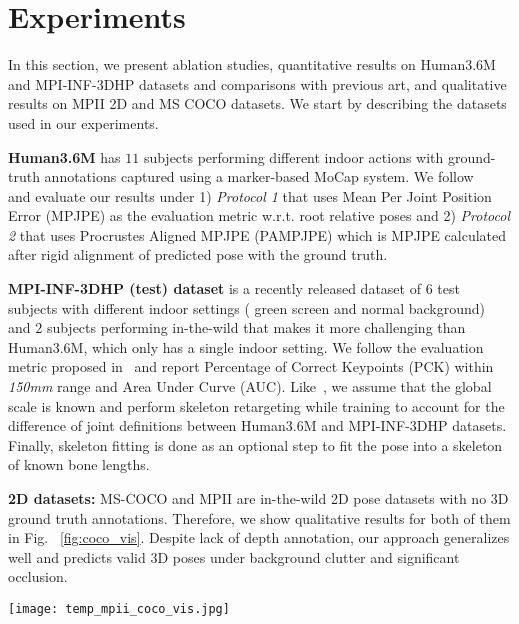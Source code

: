 \documentclass[runningheads]{llncs}
\begin{document}
\section{Experiments} \label{experiments}
In this section, we present ablation studies, quantitative results on Human3.6M and MPI-INF-3DHP datasets and comparisons with previous art, and qualitative results on MPII 2D and MS COCO datasets. We start by describing the datasets used in our experiments.

\indent \textbf{Human3.6M} has $11$ subjects performing different indoor actions with ground-truth annotations captured using a marker-based MoCap system. We follow ~\cite{Tome_2017_CVPR} and evaluate our results under 1) \textit{Protocol 1} that uses Mean Per Joint Position Error (MPJPE) as the evaluation metric w.r.t. root relative poses and 2) \textit{Protocol 2} that uses Procrustes Aligned MPJPE (PAMPJPE) which is MPJPE calculated after rigid alignment of predicted pose with the ground truth.

\textbf{MPI-INF-3DHP (test) dataset} is a recently released dataset of $6$ test subjects with different indoor settings ( green screen and normal background) and $2$ subjects performing in-the-wild that makes it more challenging than Human3.6M, which only has a single indoor setting. We follow the evaluation metric proposed in~\cite{mono-3dhp2017} and report Percentage of Correct Keypoints (PCK) within \textit{150mm} range and Area Under Curve (AUC). Like~\cite{Zhou_2017_ICCV}, we assume that the global scale is known and perform skeleton retargeting while training to account for the difference of joint definitions between Human3.6M and MPI-INF-3DHP datasets. Finally, skeleton fitting is done as an optional step to fit the pose into a skeleton of known bone lengths.

\textbf{2D datasets:} MS-COCO and MPII are in-the-wild 2D pose datasets with no 3D ground truth annotations. Therefore, we show qualitative results for both of them in Fig. ~\ref{fig:coco_vis}. Despite lack of depth annotation, our approach generalizes well and predicts valid 3D poses under background clutter and significant occlusion. 

\begin{figure*}[t]
	\centering
	\texttt{[image: temp\_mpii\_coco\_vis.jpg]}
    \caption{(a) Comparison of our temporal model TP-Net with SAP-Net on a video. The highlighted poses demonstrate the ability of TP-Net to learn temporal correlations, and smoothen and refine pose estimates from SAP-Net. (b) Qualitative results of SAP-Net on some images from MPII and MS-COCO datasets, from multiple viewpoints.}
    \label{fig:coco_vis}
    \vspace{-2em}
\end{figure*}
\vspace{-1em}
\end{document}
